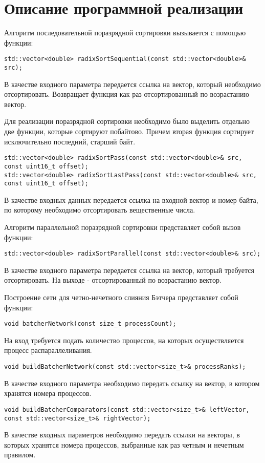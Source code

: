 \documentclass{report}
\begin{document}
\section*{Описание программной реализации}
Алгоритм последовательной поразрядной сортировки вызывается с помощью функции:
\begin{lstlisting}
std::vector<double> radixSortSequential(const std::vector<double>& src);
\end{lstlisting}
\par В качестве входного параметра передается ссылка на вектор, который необходимо отсортировать. Возвращает функция как раз отсортированный по возрастанию вектор.
\par Для реализации поразрядной сортировки необходимо было выделить отдельно две функции, которые сортируют побайтово. Причем вторая функция сортирует исключительно последний, старший байт.
\begin{lstlisting}
std::vector<double> radixSortPass(const std::vector<double>& src, const uint16_t offset);
std::vector<double> radixSortLastPass(const std::vector<double>& src, const uint16_t offset);
\end{lstlisting}
\par В качестве входных данных передается ссылка на входной вектор и номер байта, по которому необходимо отсортировать вещественные числа.
\par Алгоритм параллельной поразрядной сортировки представляет собой вызов функции:
\begin{lstlisting}
std::vector<double> radixSortParallel(const std::vector<double>& src);
\end{lstlisting}
\par В качестве входного параметра передается ссылка на вектор, который требуется отсортировать. На выходе - отсортированный по возрастанию вектор.
\par Построение сети для четно-нечетного слияния Бэтчера представляет собой функции:
\begin{lstlisting}
void batcherNetwork(const size_t processCount);
\end{lstlisting}
\par На вход требуется подать количество процессов, на которых осуществляется процесс распараллеливания.
\begin{lstlisting}
void buildBatcherNetwork(const std::vector<size_t>& processRanks);
\end{lstlisting}
\par В качестве входного параметра необходимо передать ссылку на вектор, в котором хранятся номера процессов.
\begin{lstlisting}
void buildBatcherComparators(const std::vector<size_t>& leftVector, const std::vector<size_t>& rightVector);
\end{lstlisting}
\par В качестве входных параметров необходимо передать ссылки на векторы, в которых хранятся номера процессов, выбранные как раз четным и нечетным правилом.
\newpage
\end{document}
